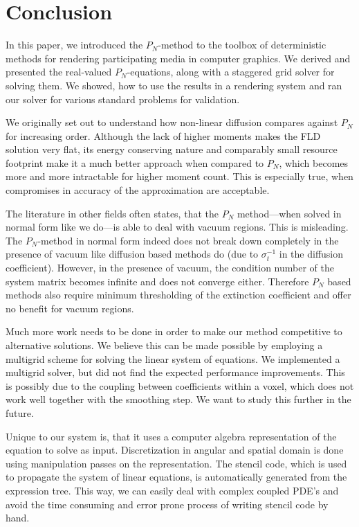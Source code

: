 \section{Conclusion}
\label{sec:conclusion}

In this paper, we introduced the $P_N$-method to the toolbox of deterministic methods for rendering participating media in computer graphics. We derived and presented the real-valued $P_N$-equations, along with a staggered grid solver for solving them. We showed, how to use the results in a rendering system and ran our solver for various standard problems for validation.

We originally set out to understand how non-linear diffusion compares against $P_N$ for increasing order. Although the lack of higher moments makes the FLD solution very flat, its energy conserving nature and comparably small resource footprint make it a much better approach when compared to $P_N$, which becomes more and more intractable for higher moment count. This is especially true, when compromises in accuracy of the approximation are acceptable.

The literature in other fields often states, that the $P_N$ method---when solved in normal form like we do---is able to deal with vacuum regions. This is misleading. The $P_N$-method in normal form indeed does not break down completely in the presence of vacuum like diffusion based methods do (due to $\sigma_t^{-1}$ in the diffusion coefficient). However, in the presence of vacuum, the condition number of the system matrix becomes infinite and does not converge either. Therefore $P_N$ based methods also require minimum thresholding of the extinction coefficient and offer no benefit for vacuum regions.

Much more work needs to be done in order to make our method competitive to alternative solutions. We believe this can be made possible by employing a multigrid scheme for solving the linear system of equations. We implemented a multigrid solver, but did not find the expected performance improvements. This is possibly due to the coupling between coefficients within a voxel, which does not work well together with the smoothing step. We want to study this further in the future.

Unique to our system is, that it uses a computer algebra representation of the equation to solve as input. Discretization in angular and spatial domain is done using manipulation passes on the representation. The stencil code, which is used to propagate the system of linear equations, is automatically generated from the expression tree. This way, we can easily deal with complex coupled PDE's and avoid the time consuming and error prone process of writing stencil code by hand.

